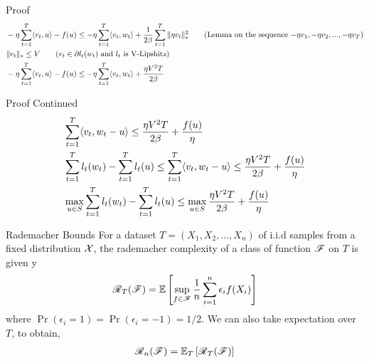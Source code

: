 \begin{frame}{Proof}
    \begin{align*}    
      & -\eta\sum_{t=1}^T \langle {v_t} , {u} \rangle -f(u) \le -\eta\sum_{t=1}^T \langle {v_t} , {w_t} \rangle +\frac{1}{2\beta} \sum_{t=1}^T \|\eta v_t\|_{*}^2 \tag{Lemma on the sequence $-\eta v_1,-\eta v_2,...,-\eta v_T$}\\
      & \|v_t\|_{*} \le V \tag{$v_t \in \partial l_t(w_t)$ and $l_t$ is V-Lipshitz} \\
      & -\eta\sum_{t=1}^T \langle {v_t} , {u} \rangle -f(u) \le -\eta\sum_{t=1}^T \langle {v_t} , {w_t} \rangle +\frac{\eta V^2T}{2\beta} \\
    \end{align*}
\end{frame}

\begin{frame}{Proof Continued}
    \begin{align*}    
      & \sum_{t=1}^T \langle {v_t} , {w_t - u} \rangle \le \frac{\eta V^2T}{2\beta} + \frac{f(u)}{\eta} \\
      & \sum_{t=1}^T l_t(w_t) - \sum_{t=1}^T l_t(u) \le \sum_{t=1}^T \langle {v_t} , {w_t - u} \rangle \le \frac{\eta V^2T}{2\beta} + \frac{f(u)}{\eta} \\
      & \max_{u \in S} \sum_{t=1}^T l_t(w_t) - \sum_{t=1}^T l_t(u) \le \max_{u \in S} \frac{\eta V^2T}{2\beta} + \frac{f(u)}{\eta}
    \end{align*}  
\end{frame}


\begin{frame}{Rademacher Bounds}
  For a dataset $T=(X_1,X_2,...,X_n)$ of i.i.d samples from a fixed distribution $\operatorname{\mathcal{X}}$, the rademacher complexity of a class of function $\operatorname{\mathscr{F}}$ on $T$ is given y
  \begin{align*}
    \operatorname{\mathscr{R}}_T(\operatorname{\mathscr{F}}) = \operatorname{\mathbb{E}} \left[ \sup_{f \in \operatorname{\mathscr{F}}} \frac{1}{n}\sum_{i=1}^n \epsilon_i f(X_i) \right]
  \end{align*}
  where $\Pr(\epsilon_i = 1) = \Pr(\epsilon_i = -1) = 1/2$.
  We can also take expectation over $T$, to obtain,
  \begin{align*}
    \operatorname{\mathscr{R}}_n(\operatorname{\mathscr{F}})=\operatorname{\mathbb{E}}_{T}\left[\operatorname{\mathscr{R}}_T(\operatorname{\mathscr{F}})\right]
  \end{align*}
\end{frame}

